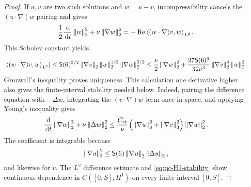 \begin{proof}
If \(u,v\) are two such solutions and \(w=u-v\), incompressibility cancels
the \((u\cdot\nabla)w\) pairing and gives
\[
 \frac12\frac{\,\mathrm d}{\,\mathrm d t}\left\lVert w\right\rVert_2^2
 +\nu\left\lVert \nabla w\right\rVert_2^2
 =-\operatorname{Re}\left\langle (w\cdot\nabla)v,w\right\rangle_{L^2}.
\]
This Sobolev constant yields
\[
 \left|\left\langle (w\cdot\nabla)v,w\right\rangle_{L^2}\right|
 \le \mathsf S(6)^{3/2}\left\lVert \nabla v\right\rVert_2
       \left\lVert w\right\rVert_2^{1/2}\left\lVert \nabla w\right\rVert_2^{3/2}
 \le\frac\nu2\left\lVert \nabla w\right\rVert_2^2
 +\frac{27\mathsf S(6)^6}{32\nu^3}
  \left\lVert \nabla v\right\rVert_2^4\left\lVert w\right\rVert_2^2.
\]
Gronwall's inequality proves uniqueness.  This calculation one derivative
higher also gives the finite-interval stability needed below.  Indeed, pairing
the difference equation with \(-\Delta w\), integrating the
\((v\cdot\nabla)w\) term once in space, and applying Young's inequality gives
\begin{equation}
 \frac{\,\mathrm d}{\,\mathrm d t}\left\lVert \nabla w\right\rVert_2^2
 +\nu\left\lVert \Delta w\right\rVert_2^2
 \le \frac{C_{\rm st}}\nu
 \left(\left\lVert \nabla u\right\rVert_3^2+\left\lVert \nabla v\right\rVert_3^2\right)
 \left\lVert \nabla w\right\rVert_2^2.
 \label{eq:qc-H1-stability}
\end{equation}
The coefficient is integrable because
\[
 \left\lVert \nabla u\right\rVert_3^2
 \le \mathsf S(6)\left\lVert \nabla u\right\rVert_2\left\lVert \Delta u\right\rVert_2,
\]
and likewise for \(v\).  The \(L^2\) difference estimate and
\eqref{eq:qc-H1-stability} show continuous dependence in
\(C([0,S];H^1)\) on every finite interval \([0,S]\).


\end{proof}
